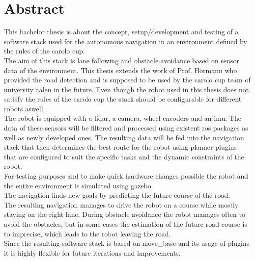 \chapter*{Abstract}
\label{abstract}
This bachelor thesis is about the concept, setup/development and testing of a software stack used for the autonomous navigation in an environment defined by the rules of the carolo cup.\\

 The aim of this stack is lane following and obstacle avoidance based on sensor data of the environment. This thesis extends the work of Prof. Hörmann who provided the road detection and is supposed to be used by the carolo cup team of university aalen in the future. Even though the robot used in this thesis does not satisfy the rules of the carolo cup the stack should be configurable for different robots aswell.\\

The robot is equipped with a lidar, a camera, wheel encoders and an imu. The data of these sensors will be filtered and processed using existent ros packages as well as newly developed ones. The resulting data will be fed into the navigation stack that then determines the best route for the robot using planner plugins that are configured to suit the specific tasks and the dynamic constraints of the robot.\\

For testing purposes and to make quick hardware changes possible the robot and the entire environment is simulated using gazebo.\\

The navigation finds new goals by predicting the future course of the road.\\

The resulting navigation manages to drive the robot on a course while mostly staying on the right lane. During obstacle avoidance the robot manages often to avoid the obstacles, but in some cases the estimation of the future road course is to imprecise, which leads to the robot leaving the road.\\

Since the resulting software stack is based on move\_base and its usage of plugins it is highly flexible for future iterations and improvements.\\